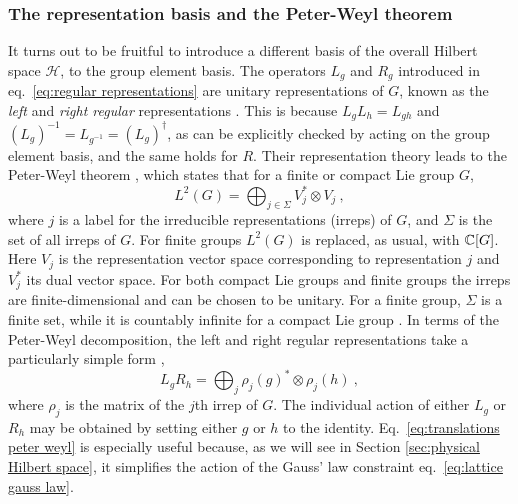 \subsubsection{The representation basis and the Peter-Weyl theorem}\label{sec:representation basis}

It turns out to be fruitful to introduce a different basis of the overall Hilbert space $\mathcal{H}$,  to the group element basis.
The operators $L_g$ and $R_g$ introduced in eq.~\eqref{eq:regular representations} are unitary representations of $G$, known as the \textit{left} and \textit{right regular} representations \cite{Serre, KnappLieGroups}.
This is because $L_g L_h = L_{gh}$ and $(L_g)^{-1}=L_{g^{-1}}=(L_g)^\dagger$, as can be explicitly checked by acting on the group element basis, and the same holds for $R$.
Their representation theory leads to the Peter-Weyl theorem \cite{KnappLieGroups, Osborne, marianithesis}, which states that for a finite or compact Lie group $G$,
\begin{equation}
    \label{eq:peterweyl}
    L^2(G) = \bigoplus_{j \in \Sigma} V_j^* \otimes V_j \ ,
\end{equation}
where $j$ is a label for the irreducible representations (irreps) of $G$, and $\Sigma$ is the set of all irreps of $G$.
For finite groups $L^2(G)$ is replaced, as usual, with $\mathbb{C}[G]$.
Here $V_j$ is the representation vector space corresponding to representation $j$ and $V_j^*$ its dual vector space.
For both compact Lie groups and finite groups the irreps are finite-dimensional and can be chosen to be unitary.
For a finite group, $\Sigma$ is a finite set, while it is countably infinite for a compact Lie group \cite{KnappLieGroups, Serre}.
In terms of the Peter-Weyl decomposition, the left and right regular representations take a particularly simple form \cite{marianithesis},
\begin{equation}
    \label{eq:translations peter weyl}
    L_g R_h = \bigoplus_j \rho_j(g)^* \otimes \rho_j(h) \ ,
\end{equation}
where $\rho_j$ is the matrix of the $j$th irrep of $G$.
The individual action of either $L_g$ or $R_h$ may be obtained by setting either $g$ or $h$ to the identity.
Eq.~\eqref{eq:translations peter weyl} is especially useful because, as we will see in Section \ref{sec:physical Hilbert space}, it simplifies the action of the Gauss' law constraint eq.~\eqref{eq:lattice gauss law}.

